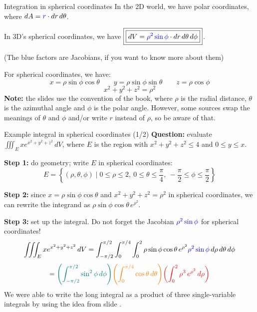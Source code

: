 \begin{frame}{Integration in spherical coordinates}
    In the 2D world, we have polar coordinates, where $dA=\textcolor{blue}{r}\cdot dr\,d\theta$.

    \pause In 3D's spherical coordinates, we have $\boxed{\boxed{dV=\textcolor{blue}{\rho^2\sin\phi}\cdot dr\,d\theta \,d\phi}}$.

    {\scriptsize(The blue factors are Jacobians, if you want to know more about them)}

    \pause For spherical coordinates, we have:
        \[\boxed{x=\rho\sin\phi\cos\theta \qquad y=\rho\sin\phi\sin\theta \qquad z=\rho\cos\phi}\]
        \[\boxed{x^2+y^2+z^2=\rho^2}\]
    \pause\textbf{Note:} the slides use the convention of the book, where $\rho$ is the radial distance, $\theta$ is the azimuthal angle and $\phi$ is the polar angle. However, some sources swap the meanings of $\theta$ and $\phi$ and/or write $r$ instead of $\rho$, so be aware of that.
\end{frame}

\begin{frame}{Example integral in spherical coordinates (1/2)}
    \footnotesize
    \textbf{Question:} evaluate $\iiint_E xe^{x^2+y^2+z^2}\,dV$, where $E$ is the region with $x^2+y^2+z^2\leq4$ and $0\leq y\leq x$.

    \pause\textbf{Step 1:} do geometry; write $E$ in spherical coordinates:
    \[E=\left\{(\rho,\theta,\phi) \mid 0\leq\rho\leq2,~0\leq\theta\leq\frac{\pi}{4},~-\frac{\pi}{2}\leq\phi\leq\frac{\pi}{2}\right\}\]

    \pause\textbf{Step 2:} since $x=\rho\sin\phi\cos\theta$ and $x^2+y^2+z^2=\rho^2$ in spherical coordinates, we can rewrite the integrand as $\rho\sin\phi\cos\theta \,e^{\rho^2}$.

    \pause\textbf{Step 3:} set up the integral. Do not forget the Jacobian $\textcolor{blue}{\rho^2\sin\phi}$ for spherical coordinates!
    \[\iiint_E xe^{x^2+y^2+z^2}\,dV = \int_{-\pi/2}^{\pi/2}\int_0^{\pi/4}\int_0^2 \rho\sin\phi\cos\theta\,e^{\rho^2}\textcolor{blue}{\rho^2\sin\phi}\,d\rho\,d\theta\,d\phi\]
    \[=\textcolor{teal}{\left(\int_{-\pi/2}^{\pi/2}\sin^2\phi\,d\phi\right)}\textcolor{orange}{\left(\int_0^{\pi/4}\cos\theta\,d\theta\right)}\textcolor{red}{\left(\int_0^2\rho^3\,e^{\rho^2}\,d\rho\right)}
 \]
    We were able to write the long integral as a product of three single-variable integrals by using the idea from slide \blue{\ref{integraltrick}}.
\end{frame}

